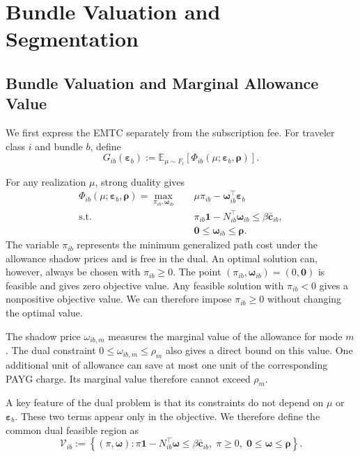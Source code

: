 \documentclass{article}
\begin{document}
\section{Bundle Valuation and Segmentation}
\label{sec:bundle-valuation-segmentation}

\subsection{Bundle Valuation and Marginal Allowance Value}
\label{sec:bundle-valuation}

We first express the EMTC separately from the subscription fee. For
traveler class $i$ and bundle $b$, define
\begin{equation}
    G_{ib}(\bm\varepsilon_b)
    :=
    \mathbb E_{\mu\sim F_i}
    \left[
        \Phi_{ib}(\mu;\bm\varepsilon_b,\bm\rho)
    \right].
    \label{eq:expected-route-cost}
\end{equation}

For any realization $\mu$, strong duality gives
\begin{align}
    \Phi_{ib}(\mu;\bm\varepsilon_b,\bm\rho)
    =
    \max_{\pi_{ib},\bm\omega_{ib}}
    \quad&
    \mu\pi_{ib}
    -
    \bm\omega_{ib}^{\top}\bm\varepsilon_b
    \label{eq:route-dual-objective}\\
    \text{s.t.}\quad&
    \pi_{ib}\bm 1
    -
    N_{ib}^{\top}\bm\omega_{ib}
    \leq
    \beta\bar{\bm c}_{ib},
    \label{eq:route-dual-path}\\
    &
    \bm0\leq\bm\omega_{ib}\leq\bm\rho.
    \label{eq:route-dual-shadow}
\end{align}
The variable $\pi_{ib}$ represents the minimum generalized path cost
under the allowance shadow prices and is free in the dual. An optimal
solution can, however, always be chosen with $\pi_{ib}\geq0$. The point
$(\pi_{ib},\bm\omega_{ib})=(0,\bm0)$ is feasible and gives zero
objective value. Any feasible solution with $\pi_{ib}<0$ gives a
nonpositive objective value. We can therefore impose
$\pi_{ib}\geq0$ without changing the optimal value.

The shadow price $\omega_{ib,m}$ measures the marginal value of the
allowance for mode $m$. The dual constraint
$0\leq\omega_{ib,m}\leq\rho_m$ also gives a direct bound on this
value. One additional unit of allowance can save at most one unit of
the corresponding PAYG charge. Its marginal value therefore cannot
exceed $\rho_m$.

A key feature of the dual problem is that its constraints do not depend
on $\mu$ or $\bm\varepsilon_b$. These two terms appear only in the
objective. We therefore define the common dual feasible region as
\begin{equation}
    \mathcal V_{ib}
    :=
    \left\{
        (\pi,\bm\omega):
        \pi\bm 1-N_{ib}^{\top}\bm\omega
        \leq
        \beta\bar{\bm c}_{ib},
        \;
        \pi\geq0,
        \;
        \bm0\leq\bm\omega\leq\bm\rho
    \right\}.
    \label{eq:dual-feasible-region}
\end{equation}
\end{document}
